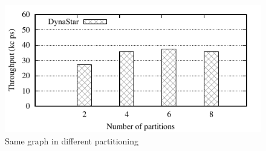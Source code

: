 \begin{figure}[ht]
	\includegraphics{figures/experiments/throughput-avg-vary-partition}
	\caption{Same graph in different partitioning}
	\label{fig:4p1p_varying_partition_size}
\end{figure}



\label{sec:evaluation:strongloc}

